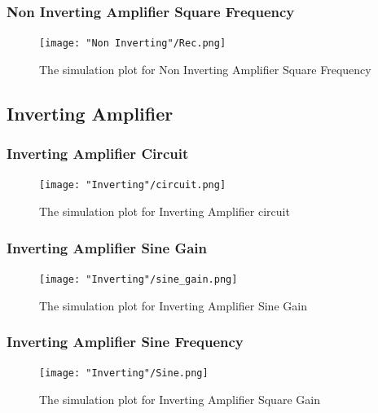 \documentclass{article}
\begin{document}
	\subsubsection{Non Inverting Amplifier Square Frequency}
	\begin{figure}[H]
	
	\centering
	\texttt{[image: "Non Inverting"/Rec.png]}
	\caption{The simulation plot for Non Inverting Amplifier Square Frequency}
	\label{fig:noninv_SquareFreq}
	\end{figure}
	
	
	
	\subsection{Inverting Amplifier}
	\subsubsection{Inverting Amplifier Circuit}
	\begin{figure}[H]
	
	\centering
	\texttt{[image: "Inverting"/circuit.png]}
	\caption{The simulation plot for Inverting Amplifier circuit}
	\label{fig:inv_circuit}
	\end{figure}
	\subsubsection{Inverting Amplifier Sine Gain}
	\begin{figure}[H]
	
	\centering
	\texttt{[image: "Inverting"/sine\_gain.png]}
	\caption{The simulation plot for Inverting Amplifier Sine Gain}
	\label{fig:inv_sine_gain}
	\end{figure}
	\subsubsection{Inverting Amplifier Sine Frequency}
	\begin{figure}[H]
	
	\centering
	\texttt{[image: "Inverting"/Sine.png]}
	\caption{The simulation plot for Inverting Amplifier Square Gain}
	\label{fig:inv_SineFreq}
	\end{figure}
	
\end{document}

